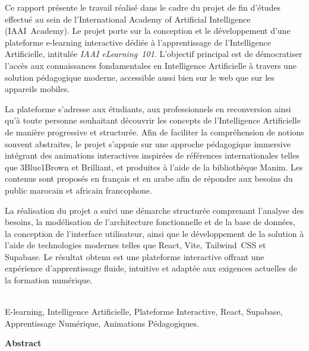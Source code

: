 \documentclass[12pt, a4paper]{report}
\begin{document}
\onehalfspacing
{\selectfont\fontsize{12}{18}\selectfont

Ce rapport présente le travail réalisé dans le cadre du projet de fin d'études
effectué au sein de l'International Academy of Artificial Intelligence (IAAI~Academy).
Le projet porte sur la conception et le développement d'une plateforme e-learning
interactive dédiée à l'apprentissage de l'Intelligence Artificielle, intitulée
\textit{IAAI eLearning~101}. L'objectif principal est de démocratiser l'accès aux
connaissances fondamentales en Intelligence Artificielle à travers une solution
pédagogique moderne, accessible aussi bien sur le web que sur les appareils mobiles.

La plateforme s'adresse aux étudiants, aux professionnels en reconversion ainsi
qu'à toute personne souhaitant découvrir les concepts de l'Intelligence Artificielle
de manière progressive et structurée. Afin de faciliter la compréhension de notions
souvent abstraites, le projet s'appuie sur une approche pédagogique immersive
intégrant des animations interactives inspirées de références internationales telles
que 3Blue1Brown et Brilliant, et produites à l'aide de la bibliothèque Manim.
Les contenus sont proposés en français et en arabe afin de répondre aux besoins
du public marocain et africain francophone.

La réalisation du projet a suivi une démarche structurée comprenant l'analyse des
besoins, la modélisation de l'architecture fonctionnelle et de la base de données,
la conception de l'interface utilisateur, ainsi que le développement de la solution
à l'aide de technologies modernes telles que React, Vite, Tailwind~CSS et Supabase.
Le résultat obtenu est une plateforme interactive offrant une expérience d'apprentissage
fluide, intuitive et adaptée aux exigences actuelles de la formation numérique.

}

\vspace{0.5cm}

\\[0.2cm]
{\selectfont\fontsize{12}{16}\selectfont
E-learning, Intelligence Artificielle, Plateforme Interactive, React, Supabase,
Apprentissage Numérique, Animations Pédagogiques.
}

\clearpage

\begin{center}
  {\sffamily\large\bfseries Abstract}
\end{center}
\end{document}
